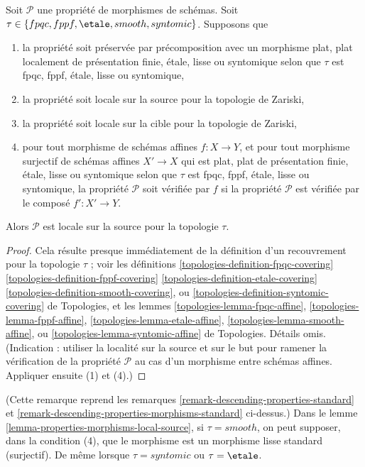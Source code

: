 \begin{lemma}
\label{lemma-properties-morphisms-local-source}
Soit $\mathcal{P}$ une propriété de morphismes de schémas.
Soit $\tau \in \{fpqc, \linebreak[0] fppf, \linebreak[0]
\etale, \linebreak[0] smooth, \linebreak[0] syntomic\}$.
Supposons que
\begin{enumerate}
\item la propriété soit préservée par précomposition avec un morphisme
plat, plat localement de présentation finie, \'etale, lisse ou syntomique
selon que $\tau$ est fpqc, fppf, \'etale, lisse ou syntomique,
\item la propriété soit locale sur la source pour la topologie de Zariski,
\item la propriété soit locale sur la cible pour la topologie de Zariski,
\item pour tout morphisme de schémas affines $f : X \to Y$, et pour tout
morphisme surjectif de schémas affines $X' \to X$ qui est plat, plat de
présentation finie, \'etale, lisse ou syntomique selon que $\tau$ est
fpqc, fppf, \'etale, lisse ou syntomique, la propriété $\mathcal{P}$ soit
vérifiée par $f$ si la propriété $\mathcal{P}$ est vérifiée par le composé
$f' : X' \to Y$.
\end{enumerate}
Alors $\mathcal{P}$ est locale sur la source pour la topologie $\tau$.
\end{lemma}

\begin{proof}
Cela résulte presque immédiatement de la définition d'un
recouvrement pour la topologie $\tau$ ; voir les définitions
\ref{topologies-definition-fpqc-covering}
\ref{topologies-definition-fppf-covering}
\ref{topologies-definition-etale-covering}
\ref{topologies-definition-smooth-covering}, ou
\ref{topologies-definition-syntomic-covering} de Topologies,
et les lemmes
\ref{topologies-lemma-fpqc-affine},
\ref{topologies-lemma-fppf-affine},
\ref{topologies-lemma-etale-affine},
\ref{topologies-lemma-smooth-affine}, ou
\ref{topologies-lemma-syntomic-affine} de Topologies.
Détails omis. (Indication : utiliser la localité sur la source et sur le but
pour ramener la vérification de la propriété $\mathcal{P}$ au cas d'un
morphisme entre schémas affines. Appliquer ensuite (1) et (4).)
\end{proof}

\begin{remark}
\label{remark-properties-morphisms-local-source-standard}
(Cette remarque reprend les remarques
\ref{remark-descending-properties-standard}
et \ref{remark-descending-properties-morphisms-standard} ci-dessus.)
Dans le lemme \ref{lemma-properties-morphisms-local-source}, si
$\tau = smooth$, on peut supposer, dans la condition (4), que le morphisme est
un morphisme lisse standard (surjectif).
De même lorsque $\tau = syntomic$ ou $\tau = \etale$.
\end{remark}



